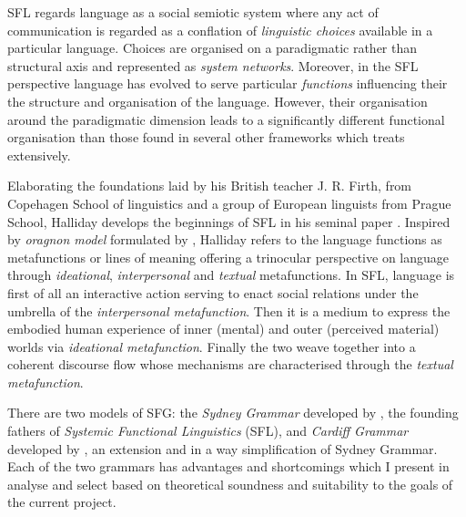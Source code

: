 SFL regards language as a social semiotic system where any act of communication is regarded as a conflation of \textit{linguistic choices} available in a particular language. Choices are organised on a paradigmatic rather than structural axis and represented as \textit{system networks}. Moreover, in the SFL perspective language has evolved to serve particular \textit{functions} influencing their the structure and organisation of the language. However, their organisation around the paradigmatic dimension leads to a significantly different functional organisation than those found in several other frameworks which \citet{Butler2003-pt1, Butler2003-pt2} treats extensively. 

Elaborating the foundations laid by his British teacher J. R. Firth, \citet{Hjelmslev53} from Copehagen School of linguistics and a group of European linguists from Prague School, Halliday develops the beginnings of SFL in his seminal paper \cite{Halliday61-orig}. Inspired by \textit{oragnon model} formulated by \citet{Buhler34}, Halliday refers to the language functions as metafunctions or lines of meaning offering a trinocular perspective on language through \textit{ideational}, \textit{interpersonal} and \textit{textual} metafunctions.
In SFL, language is first of all an interactive action serving to enact social relations under the umbrella of the \textit{interpersonal metafunction}. Then it is a medium to express the embodied human experience of inner (mental) and outer (perceived material) worlds via \textit{ideational metafunction}. Finally the two weave together into a coherent discourse flow whose mechanisms are characterised through the \textit{textual metafunction}.


% 
There are two models of SFG: the \textit{Sydney Grammar} developed by \citet{Halliday2013}, the founding fathers of \textit{Systemic Functional Linguistics} (SFL), and \textit{Cardiff Grammar} developed by \citet{Fawcett2008}, an extension and in a way simplification of Sydney Grammar. Each of the two grammars has advantages and shortcomings which I present in analyse and select based on theoretical soundness and suitability to the goals of the current project.

